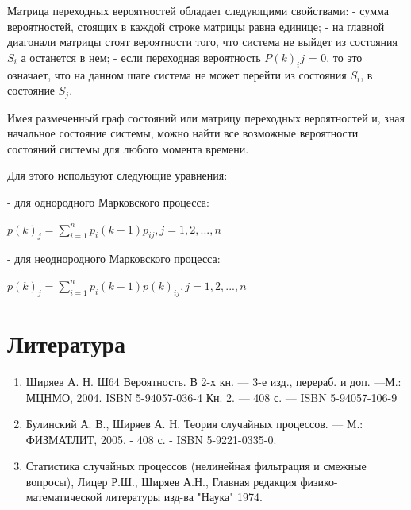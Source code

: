 \documentclass[12pt]{article}
\begin{document}
Матрица переходных вероятностей обладает следующими свойствами:
- сумма вероятностей, стоящих в каждой строке матрицы равна единице;
- на главной диагонали матрицы стоят вероятности того, что система не
выйдет из состояния $S_i$ а останется в нем;
- если переходная вероятность $P(k)_ij$ = 0, то это означает, что на данном
шаге система не может перейти из состояния $S_i$, в состояние $S_j$.

Имея размеченный граф состояний или матрицу переходных вероятностей и, зная начальное состояние системы, можно найти все возможные вероятности состояний системы для любого момента времени.

Для этого используют следующие уравнения:

- для однородного Марковского процесса:
\begin{center}
$p(k)_j = \sum_{i=1}^n p_i (k-1)  p_{ij} , j = 1, 2, ... , n$
\end{center}

- для неоднородного Марковского процесса:
\begin{center}
$p(k)_j = \sum_{i=1}^n p_i (k-1)  p(k)_{ij} , j = 1, 2, ... , n$
\end{center}

\section{Литература}

\begin{enumerate}

\item Ширяев А. Н. Ш64 Вероятность. В 2-х кн. –– 3-е изд., перераб. и доп. ––М.: МЦНМО, 2004. ISBN 5-94057-036-4 Кн. 2. –– 408 с. –– ISBN 5-94057-106-9

\item Булинский А. В., Ширяев А. Н. Теория случайных процессов. — М.: ФИЗМАТЛИТ, 2005. - 408 с. - ISBN 5-9221-0335-0.

\item Статистика случайных процессов (нелинейная фильтрация и смежные вопросы), Лицер Р.Ш., Ширяев А.Н., Главная редакция физико-математической литературы изд-ва "Наука" 1974.

\end{enumerate}
\end{document}
